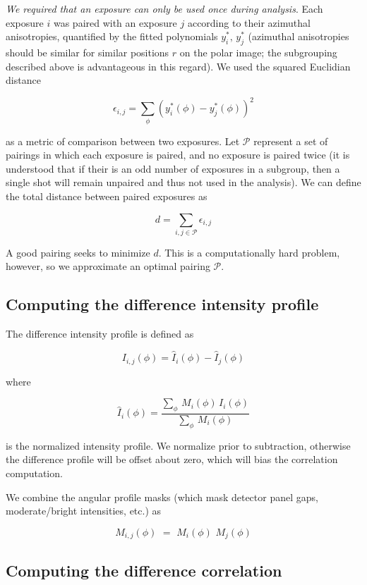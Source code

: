 \documentclass [12pt,fleqn]{article}
\def \be {\begin{equation}}
\def \ee {\end{equation}}
\begin{document}
\emph{We required that an exposure can only be used once during analysis}. Each  exposure $i$ was paired with an exposure $j$ according to their azimuthal anisotropies, quantified by the fitted polynomials $y^*_i,\, y^*_j$  (azimuthal anisotropies should be similar for similar positions $r$ on the polar image; the subgrouping described above is advantageous in this regard). We used the squared Euclidian distance

\be
\epsilon_{i,j} = \sum\limits_\phi  \left ( y^*_i (\phi) -  y^*_j (\phi) \right ) ^2
\ee

as a metric of comparison between two exposures. Let $\mathcal P$ represent a set of pairings in which each exposure is paired, and no exposure is paired twice (it is understood that if their is an odd number of exposures in a subgroup, then a single shot will remain unpaired and thus not used in the analysis). We can define the total distance between paired exposures as

\be
d = \sum_{i,j \in \mathcal P} \epsilon_{i,j}
\ee

A good pairing seeks to minimize $d$. This is a computationally hard problem, however, so we approximate an optimal pairing $\mathcal P$.

\subsection{Computing the difference intensity profile}
The difference intensity profile is defined as

\begin{equation}
I_{i,j}(\phi) = \widehat I_i(\phi) - \widehat I_{j}(\phi) 
\end{equation}

where 

\be
\widehat I_i(\phi) = \frac{\sum_\phi\, M_i(\phi)\, I_i(\phi)}  {\sum_\phi\, M_i(\phi)} 
\ee

is the normalized intensity profile. We normalize prior to subtraction, otherwise the difference profile will be offset about zero, which will bias the correlation computation.

We combine the angular profile masks (which mask detector panel gaps, moderate/bright intensities, etc.) as

\begin{equation}
M_{i,j}(\phi) \,\,= \,\,M_i(\phi)\,\,M_j(\phi)
\end{equation}

\subsection{Computing the difference correlation}
\end{document}

